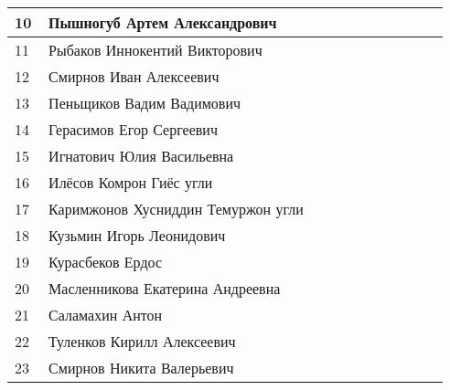\documentclass[a4paper,landscape,11pt]{article}
\begin{document}
\begin{tabular}{p{7pt}|l|p{\CS}|p{\CS}|p{\CS}|p{\CS}|p{\CS}|p{\CS}|p{\CS}|p{\CS}|p{\CS}}
10\,&  Пышногуб Артем Александрович       &&&&&&&&\\
\midrule
11\,&  Рыбаков Иннокентий Викторович      &&&&&&&&\\
12\,&  Смирнов Иван Алексеевич            &&&&&&&&\\
13\,&  Пеньщиков Вадим Вадимович          &&&&&&&&\\
14\,&  Герасимов Егор Сергеевич           &&&&&&&&\\
15\,&  Игнатович Юлия Васильевна          &&&&&&&&\\
\midrule
16\,&  Илёсов Комрон Гиёс угли&&&&&&&&\\
17\,&  Каримжонов Хусниддин Темуржон угли &&&&&&&&\\
18\,&  Кузьмин Игорь Леонидович           &&&&&&&&\\ 
19\,&  Курасбеков Ердос                   &&&&&&&&\\
20\,&  Масленникова Екатерина Андреевна   &&&&&&&&\\
\midrule
21\,&  Саламахин Антон                    &&&&&&&&\\
22\,&  Туленков Кирилл Алексеевич         &&&&&&&&\\
23\,&  Смирнов Никита Валерьевич          &&&&&&&&\\
\bottomrule
\end{tabular} 
\end{document}
